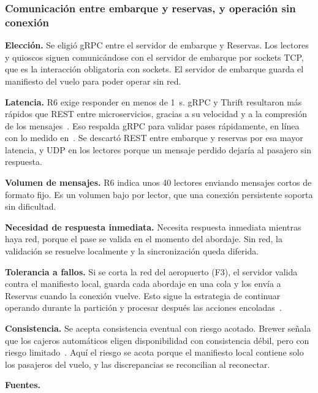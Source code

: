 \documentclass[11pt,a4paper]{article}
\newcommand{\decision}[8]{\subsubsection*{#1}%
  \textbf{Elección.} #2\par
  \textbf{Latencia.} #3\par
  \textbf{Volumen de mensajes.} #4\par
  \textbf{Necesidad de respuesta inmediata.} #5\par
  \textbf{Tolerancia a fallos.} #6\par
  \textbf{Consistencia.} #7\par
  \textbf{Fuentes.} #8\par}
\begin{document}
\decision{Comunicación entre embarque y reservas, y operación sin conexión}
 {Se eligió gRPC entre el servidor de embarque y Reservas. Los lectores y quioscos siguen comunicándose con el servidor de embarque por sockets TCP, que es la interacción obligatoria con sockets. El servidor de embarque guarda el manifiesto del vuelo para poder operar sin red.}
 {R6 exige responder en menos de 1~s. gRPC y Thrift resultaron más rápidos que REST entre microservicios, gracias a su velocidad y a la compresión de los mensajes~\cite{kumar2021protocols}. Eso respalda gRPC para validar pases rápidamente, en línea con lo medido en~\cite{niswar2024grpc}. Se descartó REST entre embarque y reservas por esa mayor latencia, y UDP en los lectores porque un mensaje perdido dejaría al pasajero sin respuesta.}
 {R6 indica unos 40 lectores enviando mensajes cortos de formato fijo. Es un volumen bajo por lector, que una conexión persistente soporta sin dificultad.}
 {Necesita respuesta inmediata mientras haya red, porque el pase se valida en el momento del abordaje. Sin red, la validación se resuelve localmente y la sincronización queda diferida.}
 {Si se corta la red del aeropuerto (F3), el servidor valida contra el manifiesto local, guarda cada abordaje en una cola y los envía a Reservas cuando la conexión vuelve. Esto sigue la estrategia de continuar operando durante la partición y procesar después las acciones encoladas~\cite{melliarsmith1998partition}.}
 {Se acepta consistencia eventual con riesgo acotado. Brewer señala que los cajeros automáticos eligen disponibilidad con consistencia débil, pero con riesgo limitado~\cite{brewer2010freedom}. Aquí el riesgo se acota porque el manifiesto local contiene solo los pasajeros del vuelo, y las discrepancias se reconcilian al reconectar.}
 {\cite{kumar2021protocols,melliarsmith1998partition,brewer2010freedom}}
 
\end{document}
